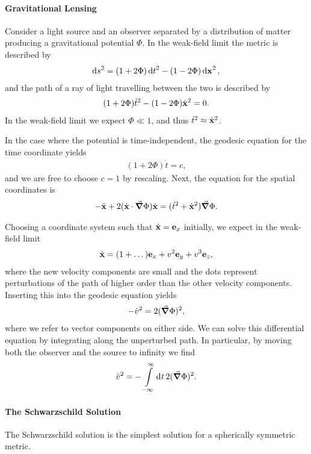 \paragraph{Gravitational Lensing}
Consider a light source and an observer separated by a distribution of matter producing a gravitational potential $\Phi$. In the weak-field limit the metric is described by
\begin{align*}
	\dd{s}^{2} = (1 + 2\Phi)\dd{t}^{2} - (1 - 2\Phi)\dd{\vb{x}}^{2},
\end{align*}
and the path of a ray of light travelling between the two is described by
\begin{align*}
	(1 + 2\Phi)\dot{t}^{2} - (1 - 2\Phi)\dot{\vb{x}}^{2} = 0.
\end{align*}
In the weak-field limit we expect $\Phi \ll 1$, and thus $\dot{t}^{2} \approx \dot{\vb{x}}^{2}$.

In the case where the potential is time-independent, the geodesic equation for the time coordinate yields
\begin{align*}
	(1 + 2\Phi)\dot{t} = c,
\end{align*}
and we are free to choose $c = 1$ by rescaling. Next, the equation for the spatial coordinates is
\begin{align*}
	-\ddot{\vb{x}} + 2(\dot{\vb{x}}\cdot\grad{\Phi})\dot{\vb{x}} = (\dot{t}^{2} + \dot{\vb{x}}^{2})\grad{\Phi}.
\end{align*}

Choosing a coordinate system such that $\dot{\vb{x}} = \vb{e}_{x}$ initially, we expect in the weak-field limit
\begin{align*}
	\dot{\vb{x}} = (1 + \dots)\vb{e}_{x} + v^{2}\vb{e}_{y} + v^{3}\vb{e}_{z},
\end{align*}
where the new velocity components are small and the dots represent perturbations of the path of higher order than the other velocity components. Inserting this into the geodesic equation yields
\begin{align*}
	-\dot{v}^{2} = 2(\grad{\Phi})^{2},
\end{align*}
where we refer to vector components on either side. We can solve this differential equation by integrating along the unperturbed path. In particular, by moving both the observer and the source to infinity we find
\begin{align*}
	\dot{v}^{2} = -\int\limits_{-\infty}^{\infty}\dd[]{t}2(\grad{\Phi})^{2}.
\end{align*}

\paragraph{The Schwarzschild Solution}
The Schwarzschild solution is the simplest solution for a spherically symmetric metric.

